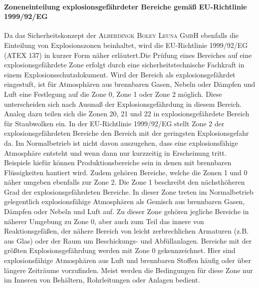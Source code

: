 \paragraph{Zoneneinteilung explosionsgefährdeter Bereiche gemäß EU-Richtlinie 1999/92/EG}
Da das Sicherheitskonzept der \textsc{Alberdingk Boley Leuna GmbH} ebenfalls die Einteilung von Explosionszonen beinhaltet, wird die EU-Richtlinie 1999/92/EG (ATEX 137) in kurzer Form näher erläutert.Die Prüfung eines Bereiches auf eine explosionsgefährdete Zone erfolgt durch eine sicherheitstechnische Fachkraft in einem Explosionsschutzdokument. Wird der Bereich als explosionsgefährdet eingestuft, ist für Atmosphären aus brennbaren Gasen, Nebeln oder Dämpfen und Luft eine Festlegung auf die Zone 0, Zone 1 oder Zone 2 möglich. Diese unterscheiden sich nach Ausmaß der Explosionsgefährdung in diesem Bereich. Analog dazu teilen sich die Zonen 20, 21 und 22 in explosionsgefährdete Bereich für Staubwolken ein.\linebreak
In der EU-Richtlinie 1999/92/EG stellt Zone 2 der explosionsgefährdeten Bereiche den Bereich mit der geringsten Explosionsgefahr da. Im Normalbetrieb ist nicht davon auszugehen, dass eine explosionsfähige Atmosphäre entsteht und wenn dann nur kurzzeitig in Erscheinung tritt. Beispiele hiefür können Produktionsbereiche sein in denen mit brennbaren Flüssigkeiten hantiert wird. Zudem gehören Bereiche, welche die Zonen 1 und 0 näher umgeben ebenfalls zur Zone 2.\linebreak
Die Zone 1 beschreibt den nächsthöheren Grad der explosionsgefährdeten Bereiche. In dieser Zone treten im Normalbetrieb gelegentlich explosionsfähige Atmosphären als Gemisch aus brennbaren Gasen, Dämpfen oder Nebeln und Luft auf. Zu dieser Zone gehören jegliche Bereiche in näherer Umgebung zu Zone 0, aber auch zum Teil das innere von Reaktionsgefäßen, der nähere Bereich von leicht zerbrechlichen Armaturen (z.B. aus Glas) oder der Raum um Beschickungs- und Abfüllanlagen.\linebreak
Bereiche mit der größten Explosionsgefährdung werden mit Zone 0 gekennzeichnet. Hier sind explosionsfähige Atmosphären aus Luft und brennbaren Stoffen häufig oder über längere Zeiträume vorzufinden. Meist werden die Bedingungen für diese Zone nur im Inneren von Behältern, Rohrleitungen oder Anlagen bedient.\,\cite{Ignatowitz.2015,bgn.2018}


